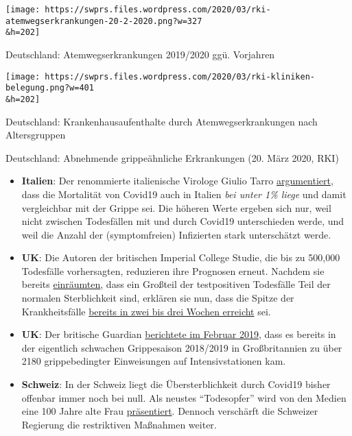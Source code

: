 \href{https://swprs.org/covid-19-hinweis-ii/rki-atemwegserkrankungen-20-2-2020/}{}

\texttt{[image: https://swprs.files.wordpress.com/2020/03/rki-atemwegserkrankungen-20-2-2020.png?w=327\\\&h=202]}

Deutschland: Atemwegserkrankungen 2019/2020 ggü. Vorjahren

\href{https://swprs.org/covid-19-hinweis-ii/rki-kliniken-belegung/}{}

\texttt{[image: https://swprs.files.wordpress.com/2020/03/rki-kliniken-belegung.png?w=401\\\&h=202]}

Deutschland: Krankenhausaufenthalte durch Atemwegserkrankungen nach
Altersgruppen

Deutschland: Abnehmende grippeähnliche Erkrankungen (20. März 2020, RKI)

\begin{itemize}
\tightlist
\item
  \textbf{Italien}: Der renommierte italienische Virologe Giulio Tarro
  \href{https://www.cybermednews.eu/index.php/it/health/70871-interview-to-the-virologist-giulio-tarro-the-death-rate-of-covid-19-is-less-than-1-as-confirmed-by-the-national-institute-of-allergy-and-infectious-diseases}{argumentiert},
  dass die Mortalität von Covid19 auch in Italien \emph{bei unter 1\%
  liege} und damit vergleichbar mit der Grippe sei. Die höheren Werte
  ergeben sich nur, weil nicht zwischen Todesfällen mit und durch
  Covid19 unterschieden werde, und weil die Anzahl der (symptomfreien)
  Infizierten stark unterschätzt werde.
\item
  \textbf{UK}: Die Autoren der britischen Imperial College Studie, die
  bis zu 500,000 Todesfälle vorhersagten, reduzieren ihre Prognosen
  erneut. Nachdem sie bereits
  \href{https://www.bbc.com/news/health-51979654}{einräumten}, dass ein
  Großteil der testpositiven Todesfälle Teil der normalen Sterblichkeit
  sind, erklären sie nun, dass die Spitze der Krankheitsfälle
  \href{https://www.thetimes.co.uk/article/nhs-now-likely-to-cope-with-coronavirus-says-key-scientist-rn5m6nggk}{bereits
  in zwei bis drei Wochen erreicht} sei.
\item
  \textbf{UK}: Der britische Guardian
  \href{https://www.theguardian.com/society/2019/feb/20/britons-urged-to-get-flu-vaccine-as-critical-cases-rise-above-2000}{berichtete
  im Februar 2019}, dass es bereits in der eigentlich schwachen
  Grippesaison 2018/2019 in Großbritannien zu über 2180 grippebedingter
  Einweisungen auf Intensivstationen kam.
\item
  \textbf{Schweiz}: In der Schweiz liegt die Übersterblichkeit durch
  Covid19 bisher offenbar immer noch bei null. Als neustes
  ``Todesopfer'' wird von den Medien eine 100 Jahre alte Frau
  \href{https://www.nau.ch/ort/basel/drei-weitere-covid-19-todesfalle-in-basel-stadt-65684099}{präsentiert}.
  Dennoch verschärft die Schweizer Regierung die restriktiven Maßnahmen
  weiter.
\end{itemize}

